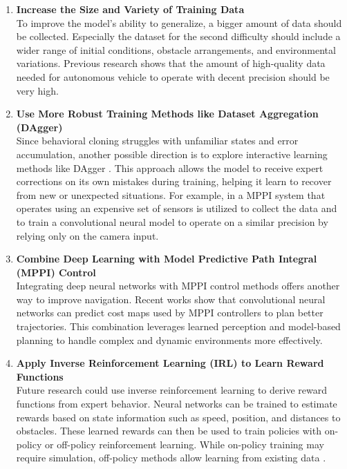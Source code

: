 \begin{enumerate}
  \item \textbf{Increase the Size and Variety of Training Data} \\
    To improve the model’s ability to generalize, a bigger amount of data should be collected. Especially the dataset for the second difficulty should include a wider range of initial conditions, obstacle arrangements, and environmental variations. Previous research \autocite{KALRA2016182} shows that the amount of high-quality data needed for autonomous vehicle to operate with decent precision should be very high.

  \item \textbf{Use More Robust Training Methods like Dataset Aggregation (DAgger)} \\
    Since behavioral cloning struggles with unfamiliar states and error accumulation, another possible direction is to explore interactive learning methods like DAgger \autocite{ross2011reduction}. This approach allows the model to receive expert corrections on its own mistakes during training, helping it learn to recover from new or unexpected situations. For example, in \autocite{pan2019agileautonomousdrivingusing} a MPPI system that operates using an expensive set of sensors is utilized to collect the data and to train a convolutional neural model to operate on a similar precision by relying only on the camera input.

  \item \textbf{Combine Deep Learning with Model Predictive Path Integral (MPPI) Control} \\
    Integrating deep neural networks with MPPI control methods offers another way to improve navigation. Recent works \autocite{lee2021approximateinversereinforcementlearning, drews2017aggressivedeepdrivingmodel} show that convolutional neural networks can predict cost maps used by MPPI controllers to plan better trajectories. This combination leverages learned perception and model-based planning to handle complex and dynamic environments more effectively.

  \item \textbf{Apply Inverse Reinforcement Learning (IRL) to Learn Reward Functions} \\
    Future research could use inverse reinforcement learning to derive reward functions from expert behavior. Neural networks can be trained to estimate rewards based on state information such as speed, position, and distances to obstacles. These learned rewards can then be used to train policies with on-policy or off-policy reinforcement learning. While on-policy training may require simulation, off-policy methods allow learning from existing data \autocite{arnob2020off}.

\end{enumerate}
